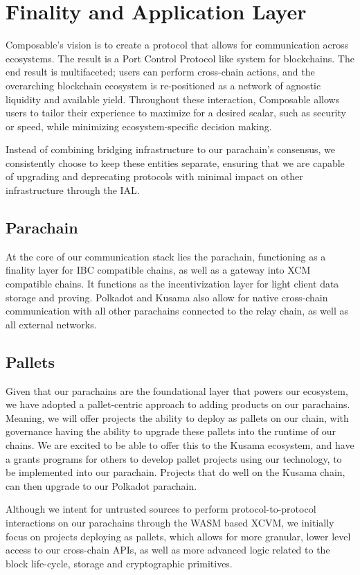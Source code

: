 \section{Finality and Application Layer}
Composable’s vision is to create a protocol that allows for communication across ecosystems. The result is a Port Control Protocol like system for blockchains. The end result is multifaceted; users can perform cross-chain actions, and the overarching blockchain ecosystem is re-positioned as a network of agnostic liquidity and available yield. Throughout these interaction, Composable allows users to tailor their experience to maximize for a desired scalar, such as security or speed, while minimizing ecosystem-specific decision making.

Instead of combining bridging infrastructure to our parachain's consensus, we consistently choose to keep these entities separate, ensuring that we are capable of upgrading and deprecating protocols with minimal impact on other infrastructure through the IAL. 

\subsection{Parachain}
At the core of our communication stack lies the parachain, functioning as a finality layer for IBC compatible chains, as well as a gateway into XCM compatible chains. It functions as the incentivization layer for light client data storage and proving. Polkadot and Kusama also allow for native cross-chain communication with all other parachains connected to the relay chain, as well as all external networks.

\subsection{Pallets}
Given that our parachains are the foundational layer that powers our ecosystem, we have adopted a pallet-centric approach to adding products on our parachains. Meaning, we will offer projects the ability to deploy as pallets on our chain, with governance having the ability to upgrade these pallets into the runtime of our chains. We are excited to be able to offer this to the Kusama ecosystem, and have a grants programs for others to develop pallet projects using our technology, to be implemented into our parachain. Projects that do well on the Kusama chain, can then upgrade to our Polkadot parachain.

Although we intent for untrusted sources to perform protocol-to-protocol interactions on our parachains through the WASM based XCVM, we initially focus on projects deploying as pallets, which allows for more granular, lower level access to our cross-chain APIs, as well as more advanced logic related to the block life-cycle, storage and cryptographic primitives.